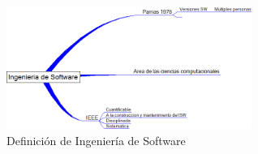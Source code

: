 \begin{figure}[h!] \centering
\includegraphics[angle=0,width=80mm]{capitulo1/definicion_isw.png}
\caption{Definici\'on de Ingenier\'ia de Software}
\label{figuregoogle}
\end {figure}